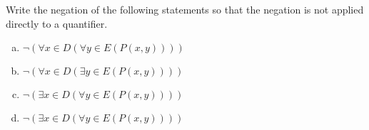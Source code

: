 \guard



\begin{exercise}
\label{exercise:negationOfMixedQuantifierStatements}
  Write the negation of the following statements so that the negation is not applied directly to a quantifier.
  \begin{enumerate}[(a)]
    \item $\neg(\forall x\in D(\forall y\in E (P(x,y)) ))$
    \item $\neg(\forall x\in D(\exists y\in E (P(x,y)) ))$
		\item $\neg(\exists x\in D(\forall y\in E (P(x,y)) ))$
    \item $\neg(\exists x\in D(\forall y\in E (P(x,y)) ))$
  \end{enumerate}
\end{exercise}
